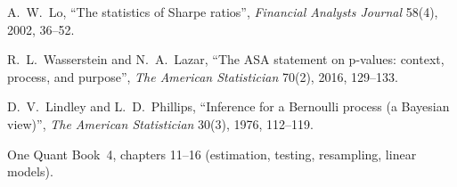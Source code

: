 \begin{omsources}
\item A.~W.~Lo, ``The statistics of Sharpe ratios'', \emph{Financial Analysts Journal} 58(4), 2002, 36--52.
\item R.~L.~Wasserstein and N.~A.~Lazar, ``The ASA statement on p-values: context, process, and purpose'',
\emph{The American Statistician} 70(2), 2016, 129--133.
\item D.~V.~Lindley and L.~D.~Phillips, ``Inference for a Bernoulli process (a Bayesian view)'', \emph{The American
Statistician} 30(3), 1976, 112--119.
\item One Quant Book~4, chapters 11--16 (estimation, testing, resampling, linear models).
\end{omsources}
